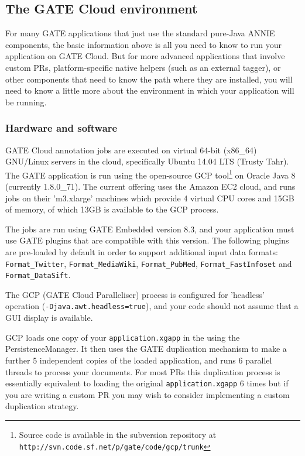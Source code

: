 \subsection{The GATE Cloud environment}

For many GATE applications that just use the standard pure-Java ANNIE
components, the basic information above is all you need to know to run your
application on GATE Cloud.  But for more advanced applications that involve
custom PRs, platform-specific native helpers (such as an external tagger), or
other components that need to know the path where they are installed, you will
need to know a little more about the environment in which your application will
be running.

\subsubsection{Hardware and software}

GATE Cloud annotation jobs are executed on virtual 64-bit (x86\_64) GNU/Linux
servers in the cloud, specifically Ubuntu 14.04 LTS (Trusty Tahr).  The GATE
application is run using the open-source GCP tool\footnote{Source code is
  available in the subversion repository at\\
  {\tt http://svn.code.sf.net/p/gate/code/gcp/trunk}} on Oracle Java 8
(currently 1.8.0\_71).  The current offering uses the Amazon EC2 cloud, and runs
jobs on their 'm3.xlarge' machines which provide 4 virtual CPU cores and 15GB of
memory, of which 13GB is available to the GCP process.

The jobs are run using GATE Embedded version 8.3, and your application must use
GATE plugins that are compatible with this version. The following plugins are
pre-loaded by default in order to support additional input data formats:
\verb!Format_Twitter!, \verb!Format_MediaWiki!, \verb!Format_PubMed!,
\verb!Format_FastInfoset! and \verb!Format_DataSift!.

The GCP (GATE Cloud Paralleliser) process is configured for 'headless' operation
(\verb^-Djava.awt.headless=true^), and your code should not assume that a GUI
display is available.

GCP loads one copy of your \verb!application.xgapp! in the
using the PersistenceManager.  It then uses the GATE
{duplication mechanism}
to make a further 5 independent copies of the loaded application, and runs 6
parallel threads to process your documents.  For most PRs this duplication
process is essentially equivalent to loading the original \verb^application.xgapp^ 6
times but if you are writing a custom PR you may wish to consider implementing
a custom duplication strategy.


